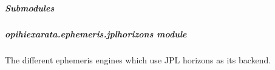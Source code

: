 \documentclass[letterpaper,11pt,english]{sphinxmanual}
\begin{document}
\subparagraph{Submodules}
\label{\detokenize{code/opihiexarata.ephemeris:submodules}}
\sphinxstepscope


\subparagraph{opihiexarata.ephemeris.jplhorizons module}
\label{\detokenize{code/opihiexarata.ephemeris.jplhorizons:module-opihiexarata.ephemeris.jplhorizons}}\label{\detokenize{code/opihiexarata.ephemeris.jplhorizons:opihiexarata-ephemeris-jplhorizons-module}}\label{\detokenize{code/opihiexarata.ephemeris.jplhorizons::doc}}
\sphinxAtStartPar
The different ephemeris engines which use JPL horizons as its backend.
\end{document}
